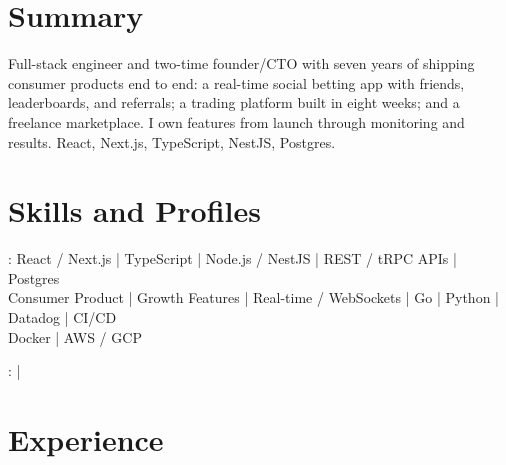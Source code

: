 \documentclass[print]{jack-resume}
\begin{document}
\pagecolor{darkmodeBackground}


\begin{minipage}[t][1cm][t]{.03\textwidth}
    \hfill
\end{minipage}

\section{Summary}
Full-stack engineer and two-time founder/CTO with seven years of shipping consumer products end to end: a real-time social betting app with friends, leaderboards, and referrals; a trading platform built in eight weeks; and a freelance marketplace. I own features from launch through monitoring and results. React, Next.js, TypeScript, NestJS, Postgres.
\sectionsep

\section{Skills and Profiles}
:
React / Next.js \hfill | \hfill
TypeScript \hfill | \hfill
Node.js / NestJS \hfill | \hfill
REST / tRPC APIs \hfill | \hfill
Postgres \\
\hspace{1.0cm} Consumer Product \hfill | \hfill
Growth Features \hfill | \hfill
Real-time / WebSockets \hfill | \hfill
Go \hfill | \hfill
Python \hfill | \hfill
Datadog \hfill | \hfill
CI/CD \\
\hspace{1.0cm} Docker \hfill | \hfill
AWS / GCP \\

\raggedright{
    :
      \href{https://www.linkedin.com/in/jack-sturtevant/}{ \ExternalLink} |
     \href{https://github.com/jacksturt}{ \ExternalLink}}

\section{Experience}
\end{document}
